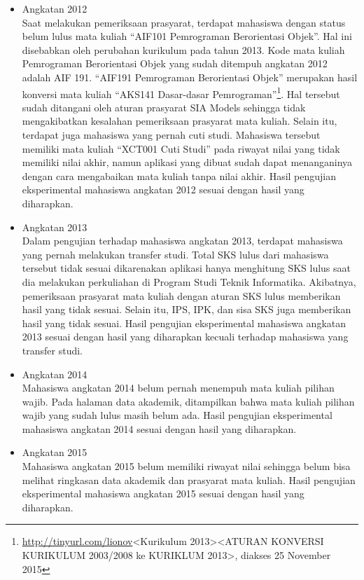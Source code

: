 		\begin{itemize}
			\item Angkatan 2012\\
			Saat melakukan pemeriksaan prasyarat, terdapat mahasiswa dengan status belum lulus mata kuliah ``AIF101 Pemrograman Berorientasi Objek''. Hal ini disebabkan oleh perubahan kurikulum pada tahun 2013. Kode mata kuliah Pemrograman Berorientasi Objek yang sudah ditempuh angkatan 2012 adalah AIF 191. ``AIF191 Pemrograman Berorientasi Objek'' merupakan hasil konversi mata kuliah ``AKS141 Dasar-dasar Pemrograman''\footnote{\url{http://tinyurl.com/lionov}<Kurikulum 2013><ATURAN KONVERSI 
KURIKULUM 2003/2008 ke KURIKLUM 2013>, diakses 25 November 2015}. Hal tersebut sudah ditangani oleh aturan prasyarat SIA Models sehingga tidak mengakibatkan kesalahan pemeriksaan prasyarat mata kuliah. Selain itu, terdapat juga mahasiswa yang pernah cuti studi. Mahasiswa tersebut memiliki mata kuliah ``XCT001 Cuti Studi'' pada riwayat nilai yang tidak memiliki nilai akhir, namun aplikasi yang dibuat sudah dapat menanganinya dengan cara mengabaikan mata kuliah tanpa nilai akhir. Hasil pengujian eksperimental mahasiswa angkatan 2012 sesuai dengan hasil yang diharapkan.
			\item Angkatan 2013\\
			Dalam pengujian terhadap mahasiswa angkatan 2013, terdapat mahasiswa yang pernah melakukan transfer studi. Total SKS lulus dari mahasiswa tersebut tidak sesuai dikarenakan aplikasi hanya menghitung SKS lulus saat dia melakukan perkuliahan di Program Studi Teknik Informatika. Akibatnya, pemeriksaan prasyarat mata kuliah dengan aturan SKS lulus memberikan hasil yang tidak sesuai. Selain itu, IPS, IPK, dan sisa SKS juga memberikan hasil yang tidak sesuai. Hasil pengujian eksperimental mahasiswa angkatan 2013 sesuai dengan hasil yang diharapkan kecuali terhadap mahasiswa yang transfer studi.
			\item Angkatan 2014\\
			Mahasiswa angkatan 2014 belum pernah menempuh mata kuliah pilihan wajib. Pada halaman data akademik, ditampilkan bahwa mata kuliah pilihan wajib yang sudah lulus masih belum ada. Hasil pengujian eksperimental mahasiswa angkatan 2014 sesuai dengan hasil yang diharapkan.
			\item Angkatan 2015\\
			Mahasiswa angkatan 2015 belum memiliki riwayat nilai sehingga belum bisa melihat ringkasan data akademik dan prasyarat mata kuliah. Hasil pengujian eksperimental mahasiswa angkatan 2015 sesuai dengan hasil yang diharapkan.
		\end{itemize}